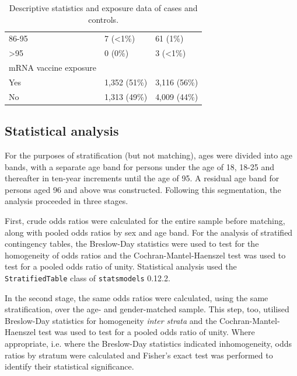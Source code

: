 \documentclass{article}
\begin{document}
\begin{table}[]
\begin{tabular}{@{}lll@{}}
\rowcolor[HTML]{EFEFEF}
\hspace{5mm}86-95                 & 7 (\textless{}1\%) & 61 (1\%)           \\
\rowcolor[HTML]{C0C0C0}
\hspace{5mm}\textgreater{}95      & 0 (0\%)            & 3 (\textless{}1\%) \\ \midrule
mRNA vaccine exposure &                    &                    \\
\rowcolor[HTML]{EFEFEF}
\hspace{5mm}Yes                   & 1,352 (51\%)       & 3,116 (56\%)       \\
\rowcolor[HTML]{C0C0C0}
\hspace{5mm}No                    & 1,313 (49\%)       & 4,009 (44\%)
\end{tabular}%
\caption{Descriptive statistics and exposure data of cases and controls.}
\label{tab:case-control-characteristics}
\end{table}

\subsection{Statistical analysis}

For the purposes of stratification (but not matching), ages were divided into age bands, with a separate age band for persons under the age of 18, 18-25 and thereafter in ten-year increments until the age of 95.
A residual age band for persons aged 96 and above was constructed.
Following this segmentation, the analysis proceeded in three stages.

First, crude odds ratios were calculated for the entire sample before matching, along with pooled odds ratios by sex and age band.
For the analysis of stratified contingency tables, the Breslow-Day statistics were used to test for the homogeneity of odds ratios and the Cochran-Mantel-Haenszel test was used to test for a pooled odds ratio of unity.
Statistical analysis used the \texttt{StratifiedTable} class of \texttt{statsmodels} 0.12.2.\cite{seabold2010statsmodels}

In the second stage, the same odds ratios were calculated, using the same stratification, over the age- and gender-matched sample.
This step, too, utilised Breslow-Day statistics for homogeneity \textit{inter strata} and the Cochran-Mantel-Haenszel test was used to test for a pooled odds ratio of unity.
Where appropriate, i.e. where the Breslow-Day statistics indicated inhomogeneity, odds ratios by stratum were calculated and Fisher's exact test was performed to identify their statistical significance.
\end{document}
